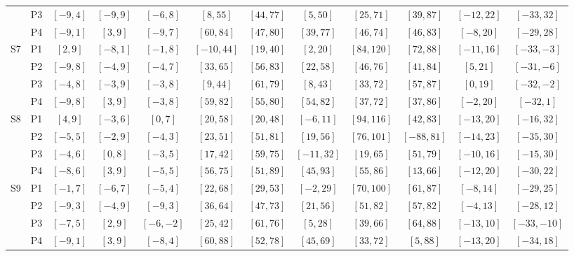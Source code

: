 \begin{table}[!ht]
{\begin{tabular}{|c|c||c|c|c|c|c|c|c|c|c|c|}
     & P3 & $[-9, 4]$ & $[-9, 9]$ & $[-6, 8]$ & $[8, 55]$ & $[44, 77]$ & $[5, 50]$ & $[25, 71]$ & $[39, 87]$ & $[-12, 22]$ & $[-33, 32]$ \\
     & P4 & $[-9, 1]$ & $[3, 9]$ & $[-9, 7]$ & $[60, 84]$ & $[47, 80]$ & $[39, 77]$ & $[46, 74]$ & $[46, 83]$ & $[-8, 20]$ & $[-29, 28]$ \\
    \hline
    \hline
    \multirow{4}{*}{S7} & P1 & $[2, 9]$ & $[-8, 1]$ & $[-1, 8]$ & $[-10, 44]$ & $[19, 40]$ & $[2, 20]$ & $[84, 120]$ & $[72, 88]$ & $[-11, 16]$ & $[-33, -3]$ \\
     & P2 & $[-9, 8]$ & $[-4, 9]$ & $[-4, 7]$ & $[33, 65]$ & $[56, 83]$ & $[22, 58]$ & $[46, 76]$ & $[41, 84]$ & $[5, 21]$ & $[-31, -6]$ \\
     & P3 & $[-4, 8]$ & $[-3, 9]$ & $[-3, 8]$ & $[9, 44]$ & $[61, 79]$ & $[8, 43]$ & $[33, 72]$ & $[57, 87]$ & $[0, 19]$ & $[-32, -2]$ \\
     & P4 & $[-9, 8]$ & $[3, 9]$ & $[-3, 8]$ & $[59, 82]$ & $[55, 80]$ & $[54, 82]$ & $[37, 72]$ & $[37, 86]$ & $[-2, 20]$ & $[-32, 1]$ \\
    \hline
    \hline
    \multirow{4}{*}{S8} & P1 & $[4, 9]$ & $[-3, 6]$ & $[0, 7]$ & $[20, 58]$ & $[20, 48]$ & $[-6, 11]$ & $[94, 116]$ & $[42, 83]$ & $[-13, 20]$ & $[-16, 32]$ \\
     & P2 & $[-5, 5]$ & $[-2, 9]$ & $[-4, 3]$ & $[23, 51]$ & $[51, 81]$ & $[19, 56]$ & $[76, 101]$ & $[-88, 81]$ & $[-14, 23]$ & $[-35, 30]$ \\
     & P3 & $[-4, 6]$ & $[0, 8]$ & $[-3, 5]$ & $[17, 42]$ & $[59, 75]$ & $[-11, 32]$ & $[19, 65]$ & $[51, 79]$ & $[-10, 16]$ & $[-15, 30]$ \\
     & P4 & $[-8, 6]$ & $[3, 9]$ & $[-5, 5]$ & $[56, 75]$ & $[51, 89]$ & $[45, 93]$ & $[55, 86]$ & $[13, 66]$ & $[-12, 20]$ & $[-30, 22]$ \\
    \hline
    \hline
    \multirow{4}{*}{S9} & P1 & $[-1, 7]$ & $[-6, 7]$ & $[-5, 4]$ & $[22, 68]$ & $[29, 53]$ & $[-2, 29]$ & $[70, 100]$ & $[61, 87]$ & $[-8, 14]$ & $[-29, 25]$ \\
     & P2 & $[-9, 3]$ & $[-4, 9]$ & $[-9, 3]$ & $[36, 64]$ & $[47, 73]$ & $[21, 56]$ & $[51, 82]$ & $[57, 82]$ & $[-4, 13]$ & $[-28, 12]$ \\
     & P3 & $[-7, 5]$ & $[2, 9]$ & $[-6, -2]$ & $[25, 42]$ & $[61, 76]$ & $[5, 28]$ & $[39, 66]$ & $[64, 88]$ & $[-13, 10]$ & $[-33, -10]$ \\
     & P4 & $[-9, 1]$ & $[3, 9]$ & $[-8, 4]$ & $[60, 88]$ & $[52, 78]$ & $[45, 69]$ & $[33, 72]$ & $[5, 88]$ & $[-13, 20]$ & $[-34, 18]$ \\

\end{tabular}}
\end{table}
